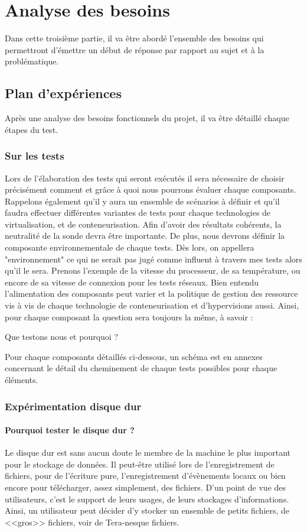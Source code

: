 \chapter{Analyse des besoins}

Dans cette troisième partie, il va être abordé l'ensemble des besoins qui permettront d'émettre un début de réponse par rapport au sujet et à la problématique.


\section{Plan d'expériences}

Après une analyse des besoins fonctionnels du projet, il va être détaillé chaque étapes du test.

\subsection{Sur les tests}

Lors de l'élaboration des tests qui seront exécutés il sera nécessaire de choisir précisément comment et grâce à quoi nous pourrons évaluer chaque composants. Rappelons également qu'il y aura un ensemble de scénarios à définir et qu'il faudra effectuer différentes variantes de tests pour chaque technologies de virtualisation, et de conteneurisation. Afin d'avoir des résultats cohérents, la neutralité de la sonde devra être importante. De plus, nous devrons définir la composante environnementale de chaque tests. Dès lors, on appellera "environnement" ce qui ne serait pas jugé comme influent à travers mes tests alors qu'il le sera. Prenons l'exemple de la vitesse du processeur, de sa température, ou encore de sa vitesse de connexion pour les tests réseaux. Bien entendu l'alimentation des composants peut varier et la politique de gestion des ressource vis à vis de chaque technologie de conteneurisation et d'hypervisions aussi.
Ainsi, pour chaque composant la question sera toujours la même, à savoir : 
\begin{center}
Que testons nous et pourquoi ? 
\end{center} 
Pour chaque composants détaillés ci-dessous, un schéma est en annexes concernant le détail du cheminement de chaque tests possibles pour chaque éléments.
\subsection{Expérimentation disque dur}
\subsubsection{Pourquoi tester le disque dur ? }
Le disque dur est sans aucun doute le membre de la machine le plus important pour le stockage de données. Il peut-être utilisé lors de l'enregistrement de fichiers, pour de l'écriture pure, l'enregistrement d'évènements locaux ou bien encore pour télécharger, assez simplement, des fichiers. D'un point de vue des utilisateurs, c'est le support de leurs usages, de leurs stockages d'informations. Ainsi, un utilisateur peut décider d'y stocker un ensemble de petits fichiers, de <<gros>> fichiers, voir de Tera-nesque fichiers.  
